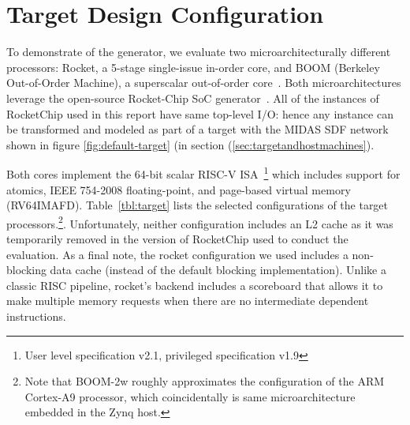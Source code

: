\section{Target Design Configuration}

To demonstrate of the generator, we evaluate two microarchitecturally different
processors:  Rocket, a 5-stage single-issue in-order core, and BOOM (Berkeley
Out-of-Order Machine), a superscalar out-of-order core~\cite{boom}. Both
microarchitectures leverage the open-source Rocket-Chip SoC
generator~\cite{rocketchip}. All of the instances of RocketChip used in this
report have same top-level I/O: hence any instance can be transformed and
modeled as part of a target with the MIDAS SDF network shown in figure
\ref{fig:default-target} (in section (\ref{sec:targetandhostmachines}).

Both cores implement the 64-bit scalar RISC-V ISA~\cite{Waterman:EECS-2016-118,
Waterman:EECS-2016-161}\footnote{User level specification v2.1, privileged
specification v1.9} which includes support for atomics, IEEE 754-2008
floating-point, and page-based virtual memory (RV64IMAFD).
Table~\ref{tbl:target} lists the selected configurations of the target
processors.\footnote{Note that BOOM-2w roughly approximates the configuration
of the ARM Cortex-A9 processor, which coincidentally is same microarchitecture
embedded in the Zynq host.}. Unfortunately, neither configuration includes an
L2 cache as it was  temporarily removed in the version of RocketChip used to
conduct the evaluation. As a final note, the rocket configuration we used
includes a non-blocking data cache (instead of the default blocking
implementation). Unlike a classic RISC pipeline, rocket's backend includes a
scoreboard that allows it to make multiple memory requests when there are no
intermediate dependent instructions.

\begin{table}
\begin{center}
\end{center}
\caption{Processor Parameters}
\label{tbl:target}
\end{table}%

